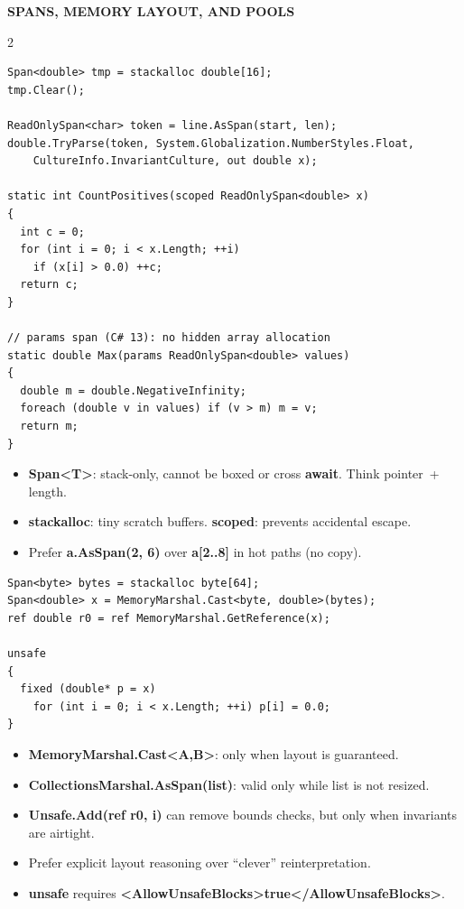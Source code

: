 \documentclass[9pt,a4paper]{extarticle}
\newenvironment{card}[3][acBlue]{%
  \begin{tcolorbox}[
    enhanced, colback=#2, colframe=bdCard,
    coltitle=black, colbacktitle=#2!70!bgHdr,
    fonttitle=\bfseries\fontsize{6.0pt}{7.2pt}\selectfont\MakeUppercase,
    title={#3},
    left=3pt, right=2pt, top=1.2pt, bottom=1.6pt,
    toptitle=1.0pt, bottomtitle=1.0pt,
    boxrule=0.4pt,
    borderline west={3pt}{0pt}{#1},
    arc=2pt, before skip=0pt, after skip=1.6mm,
    breakable,
  ]}{\end{tcolorbox}}
\newcommand{\sectionbanner}[1]{%
  \vspace{0.5mm}%
  {\setlength{\fboxsep}{1.5pt}%
   \colorbox{secBg}{\color{white}\bfseries\fontsize{6.5pt}{7.7pt}\selectfont
   \MakeUppercase{\hspace{0.5mm}#1\hspace{0.5mm}}}%
  }\vspace{1.3mm}\par\nobreak}
\newcommand{\code}[1]{{\ttfamily\bfseries #1}}
\begin{document}
\sectionbanner{Spans, Memory Layout, and Pools}
\begin{multicols}{2}

\begin{card}[acGreen]{bgGreen}{Span, ReadOnlySpan, stackalloc, scoped}
\begin{lstlisting}[style=cs]
Span<double> tmp = stackalloc double[16];
tmp.Clear();

ReadOnlySpan<char> token = line.AsSpan(start, len);
double.TryParse(token, System.Globalization.NumberStyles.Float,
    CultureInfo.InvariantCulture, out double x);

static int CountPositives(scoped ReadOnlySpan<double> x)
{
  int c = 0;
  for (int i = 0; i < x.Length; ++i)
    if (x[i] > 0.0) ++c;
  return c;
}

// params span (C# 13): no hidden array allocation
static double Max(params ReadOnlySpan<double> values)
{
  double m = double.NegativeInfinity;
  foreach (double v in values) if (v > m) m = v;
  return m;
}
\end{lstlisting}
\begin{itemize}
\item \code{Span<T>}: stack-only, cannot be boxed or cross \code{await}. Think pointer~+ length.
\item \code{stackalloc}: tiny scratch buffers. \code{scoped}: prevents accidental escape.
\item Prefer \code{a.AsSpan(2, 6)} over \code{a[2..8]} in hot paths (no copy).
\end{itemize}
\end{card}

\begin{card}[acPurple]{bgPurple}{MemoryMarshal and Unsafe}
\begin{lstlisting}[style=cs]
Span<byte> bytes = stackalloc byte[64];
Span<double> x = MemoryMarshal.Cast<byte, double>(bytes);
ref double r0 = ref MemoryMarshal.GetReference(x);

unsafe
{
  fixed (double* p = x)
    for (int i = 0; i < x.Length; ++i) p[i] = 0.0;
}
\end{lstlisting}
\begin{itemize}
\item \code{MemoryMarshal.Cast<A,B>}: only when layout is guaranteed.
\item \code{CollectionsMarshal.AsSpan(list)}: valid only while list is not resized.
\item \code{Unsafe.Add(ref r0, i)} can remove bounds checks, but only when invariants are airtight.
\item Prefer explicit layout reasoning over ``clever'' reinterpretation.
\item \code{unsafe} requires \code{<AllowUnsafeBlocks>true</AllowUnsafeBlocks>}.
\end{itemize}
\end{card}


\end{multicols}
\end{document}

